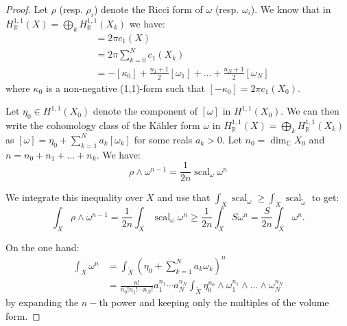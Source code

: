 \documentclass{amsart}
\numberwithin{equation}{section}
\theoremstyle{definition}
\DeclareMathOperator{\scal}{scal}
\begin{document}
\begin{proof}
Let $\rho$ (resp. $\rho_i$) denote the Ricci form of $\omega$ (resp. $\omega_i$). We know that in $H_{\mathbb{R}}^{1,1}(X)=\bigoplus_k H^{1,1}_\mathbb{R}(X_k)$ we have:
\begin{align*}
[\rho]&=2\pi c_1(X)\\
&=2\pi \sum_{k=0}^N c_1(X_k)\\
&=-[\kappa_0]+\frac{n_1+1}{2}[\omega_1]+\dots+\frac{n_N+1}{2}[\omega_N]
\end{align*}
where $\kappa_0$ is a non-negative (1,1)-form such that $[-\kappa_0]=2\pi c_1(X_0)$.

Let $\eta_0\in H^{1,1}(X_0)$ denote the component of $[\omega]$ in $H^{1,1}(X_0)$. We can then write the cohomology class of the K\"ahler form $\omega$ in $H_{\mathbb{R}}^{1,1}(X)=\bigoplus_k H^{1,1}_\mathbb{R}(X_k)$ as  $[\omega]=\eta_0+\sum_{k=1}^Na_k[\omega_k]$ for some reals $a_k>0$. %
Let $n_0=\dim_\mathbb{C}X_0$ and $n=n_0+n_1+\dots+n_k$. We have:
\[\rho\wedge\omega^{n-1}=\frac{1}{2n}\scal_\omega\omega^n%
\]

We integrate this inequality over $X$ and use that $\int_X\scal_\omega\geq\int_X\scal_{\tilde\omega}$
to get:
\[\int_{X}\rho\wedge\omega^{n-1}=\frac{1}{2n}\int_X\scal_\omega\omega^n\geq\frac{1}{2n}\int_X S\omega^n =\frac{S}{2n}\int_{X}\omega^n.\]

On the one hand:
\begin{align*}
\int_{X}\omega^{n}&=\int_{\tilde X}\left(\eta_0+\sum_{k=1}^Na_k\omega_k\right)^{n} \\
&=\frac{n!}{n_0!n_1!\cdots n_N!}a_1^{n_1}\cdots a_N^{n_N}\int_{\tilde X}\eta_0^{n_0}\wedge\omega_1^{n_1}\wedge\dots\wedge\omega_N^{n_N}
\end{align*}
by expanding the $n-$th power and keeping only the multiples of the volume form.


\end{proof}
\end{document}
